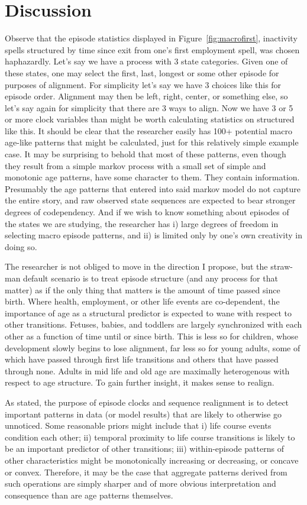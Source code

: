 \documentclass{article}
\begin{document}
\section{Discussion}
Observe that the episode statistics displayed in Figure~\ref{fig:macrofirst},
inactivity spells structured by time since exit from one's first employment
spell, was chosen haphazardly. Let's say we have a process with 3 state
categories. Given one of these states, one may select the first, last, longest
or some other episode for purposes of alignment. For simplicity let's say we
have 3 choices like this for episode order. Alignment may then be left, right,
center, or something else, so let's say again for simplicity that there are 3
ways to align. Now we have 3 or 5 or more clock variables than might be worth
calculating statistics on structured like this. It should be clear that the
researcher easily has 100+ potential macro age-like patterns that might be
calculated, just for this relatively simple example case. It may be surprising
to behold that most of these patterns, even though they result from a simple markov
process with a small set of simple and monotonic age patterns, have some
character to them. They contain information. Presumably the age patterns that
entered into said markov model do not capture the entire story, and raw
observed state sequences are expected to bear stronger degrees of
codependency. And if we wish to know something about
episodes of the states we are studying, the researcher has i) large degrees of freedom in selecting macro episode patterns, and ii) is limited only by one's own creativity in doing so.

The researcher is not obliged to move in
the direction I propose, but the straw-man default scenario is to treat
episode structure (and any process for that matter) as if the only thing that matters is the
amount of time passed since birth. Where health, employment, or other life
events are co-dependent, the importance of age as a structural predictor is
expected to wane with respect to other transitions. Fetuses, babies, and
toddlers are largely synchronized with each other as a function of time until or
since birth. This is less so for children, whose development slowly begins to
lose alignment, far less so for young adults, some of which have passed through
first life transitions and others that have passed through none. Adults in mid
life and old age are maximally heterogenous with respect to age structure. To
gain further insight, it makes sense to realign.

As stated, the purpose of episode clocks and sequence realignment is to detect
important patterns in data (or model results) that are likely to otherwise
go unnoticed. Some reasonable priors might include that i) life course events
condition each other; ii) temporal proximity to life course transitions is likely to be an important
predictor of other transitions; iii) within-episode patterns of other
characteristics might be monotonically increasing or decreasing, or concave or
convex. Therefore, it may be the case that aggregate patterns derived from such
operations are simply sharper and of more obvious interpretation and consequence
than are age patterns themselves. 
\end{document}

